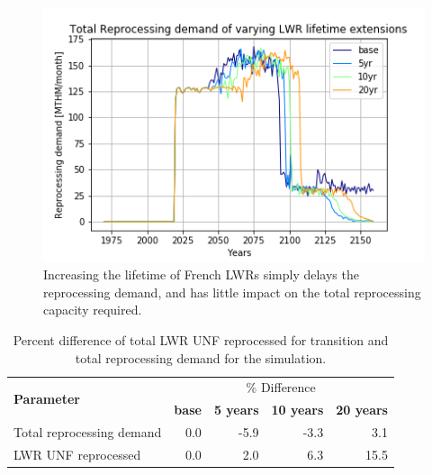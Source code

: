 \begin{figure}[htbp!]
    \begin{center}
        \includegraphics[scale=0.7]{./images/sensitivity/ext_tot_rep.png}
    \end{center}
    \caption{Increasing the lifetime of French \glspl{LWR} simply delays the
             reprocessing demand, and has little impact on the total 
     reprocessing capacity required.}
    \label{fig:ext_all}
\end{figure}

\begin{table}[h]
	\centering
	\caption{Percent difference of total \gls{LWR} \gls{UNF} reprocessed
		for transition and total reprocessing demand for the simulation.}
	\begin{tabular}{lrrrr}
		\hline
		\multirow{2}{*}{\textbf{Parameter}} & \multicolumn{4}{c}{\% Difference} \\
		& \textbf{base}& \textbf{5 years} & \textbf{10 years} & \textbf{20 years} \\
		\hline
		Total reprocessing demand & 0.0 & -5.9 & -3.3 & 3.1 \\
		\gls{LWR} \gls{UNF} reprocessed & 0.0  & 2.0 & 6.3 & 15.5 \\
		\hline
	\end{tabular}
	\label{tab:ext_diff}
\end{table}

